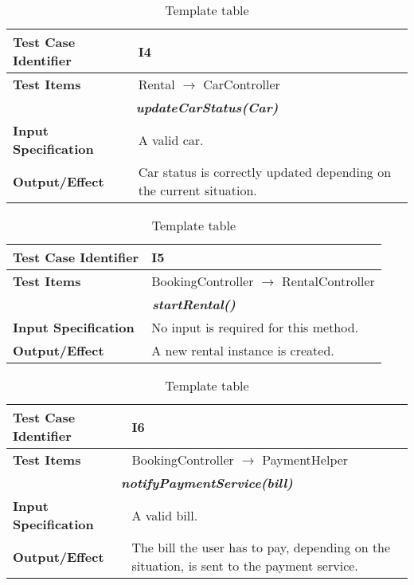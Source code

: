 \begin{table}[h]
	\begin{tabularx}{\textwidth}{l X}
		\hline
		\textbf{Test Case Identifier}	&	I4\\	\hline
		\textbf{Test Items}			&	Rental $\rightarrow$ CarController \\	\hline\hline
		\multicolumn{2}{c}{\textbf{\textit{updateCarStatus(Car)}}}	\\	\hline
			\textbf{Input Specification}	&	A valid car.\\	\hline
			\textbf{Output/Effect}	&	Car status is correctly updated depending on the current situation.\\	\hline\hline
	\end{tabularx}
	\captionsetup{textformat=empty,labelformat=blank}
	\caption{Template table}
	\label{table:template-table}
\end{table}

\begin{table}[h]
	\begin{tabularx}{\textwidth}{l X}
		\hline
		\textbf{Test Case Identifier}	&	I5\\	\hline
		\textbf{Test Items}			&	BookingController $\rightarrow$ RentalController \\	\hline\hline
		\multicolumn{2}{c}{\textbf{\textit{startRental()}}}	\\	\hline
			\textbf{Input Specification}	&	No input is required for this method.\\	\hline
			\textbf{Output/Effect}	&	A new rental instance is created.\\	\hline\hline
	\end{tabularx}
	\captionsetup{textformat=empty,labelformat=blank}
	\caption{Template table}
	\label{table:template-table}
\end{table}

\begin{table}[h]
	\begin{tabularx}{\textwidth}{l X}
		\hline
		\textbf{Test Case Identifier}	&	I6\\	\hline
		\textbf{Test Items}			&	BookingController $\rightarrow$ PaymentHelper \\	\hline\hline
		\multicolumn{2}{c}{\textbf{\textit{notifyPaymentService(bill)}}}	\\	\hline
			\textbf{Input Specification}	&	A valid bill.\\	\hline
			\textbf{Output/Effect}	&	The bill the user has to pay, depending on the situation, is sent to the payment service.\\	\hline\hline
	\end{tabularx}
	\captionsetup{textformat=empty,labelformat=blank}
	\caption{Template table}
	\label{table:template-table}
\end{table}

